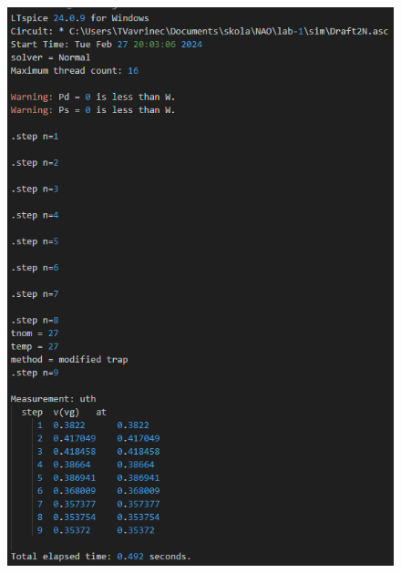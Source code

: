 \begin{figure}[H]
    \begin{minipage}{0.5\textwidth}
        \includegraphics[height=0.4\textheight]{log/N-UTH00-WL_dinamic.png}
    \end{minipage}
    \hfill
    \begin{minipage}{0.5\textwidth}

\end{minipage}
\end{figure}
